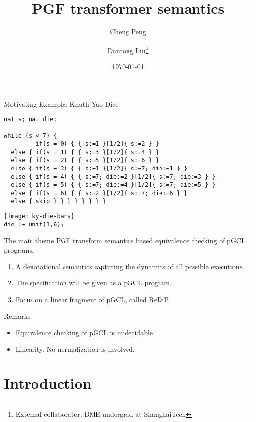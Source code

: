 \documentclass[8pt]{beamer}
\title{PGF transformer semantics}
\author{Cheng Peng \and Dantong Liu\thanks{External collaborator, BME undergrad at ShanghaiTech}}
\date{\today}
\begin{document}
\maketitle

\begin{frame}{Motivating Example: Knuth-Yao Dice}
	\begin{verbatim}
nat s; nat die;

while (s < 7) {
         if(s = 0) { { s:=1 }[1/2]{ s:=2 } }
  else { if(s = 1) { { s:=3 }[1/2]{ s:=4 } }
  else { if(s = 2) { { s:=5 }[1/2]{ s:=6 } }
  else { if(s = 3) { { s:=1 }[1/2]{ s:=7; die:=1 } }
  else { if(s = 4) { { s:=7; die:=2 }[1/2]{ s:=7; die:=3 } }
  else { if(s = 5) { { s:=7; die:=4 }[1/2]{ s:=7; die:=5 } }
  else { if(s = 6) { { s:=2 }[1/2]{ s:=7; die:=6 } }
  else { skip } } } } } } } }
		\end{verbatim}

	\texttt{[image: ky-die-bars]}\\
	\verb|die := unif(1,6);|
\end{frame}

\begin{frame}{The main theme}
	PGF transform semantics based equivalence checking of pGCL programs.
	\begin{enumerate}
		\item A denotational semantics capturing the dynamics of all possible executions.
		\item The specification will be given as a pGCL program.
		\item Focus on a linear fragment of pGCL, called ReDiP.
	\end{enumerate}
	\hfill
	\begin{block}{Remarks}
		\begin{itemize}
			\item Equivalence checking of pGCL is undecidable
			\item Linearity. No normalization is involved.
		\end{itemize}
	\end{block}
\end{frame}

\section{Introduction}
\end{document}
